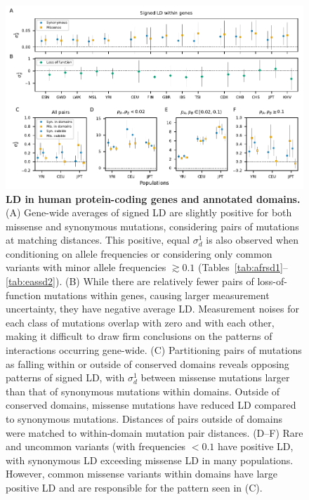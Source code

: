 \documentclass[]{article}
\begin{document}
\begin{figure}[tb!]
    \centering
    \includegraphics{../figures/data_compact}
    \caption{
        \textbf{LD in human protein-coding genes and annotated domains.}
        (A) Gene-wide averages of signed LD are slightly positive
        for both missense and synonymous mutations, considering pairs of mutations
        at matching distances. This positive, equal \(\sigma_d^1\) is also observed
        when conditioning on allele frequencies or considering only common variants
        with minor allele frequencies \(\gtrsim 0.1\)
        (Tables~\ref{tab:afrsd1}--\ref{tab:eassd2}).
        (B) While there are relatively fewer pairs of loss-of-function mutations
        within genes, causing larger measurement uncertainty, they have
        negative average LD. Measurement noises for each class of
        mutations overlap with zero and with each other, making it difficult to
        draw firm conclusions on the patterns of interactions occurring gene-wide.
        (C) Partitioning pairs of mutations as falling within or outside
        of conserved domains reveals opposing patterns of signed LD, with
        \(\sigma_d^1\) between missense mutations larger than that of synonymous
        mutations within domains. Outside of conserved domains, missense mutations
        have reduced LD compared to synonymous mutations. Distances of pairs outside
        of domains were matched to within-domain mutation pair distances.
        (D--F) Rare and uncommon variants (with frequencies $<0.1$ have positive
        LD, with synonymous LD exceeding missense LD in many populations. However,
        common missense variants within domains have large positive LD and are
        responsible for the pattern seen in (C).
    }
    \label{fig:data}
\end{figure}
\end{document}
